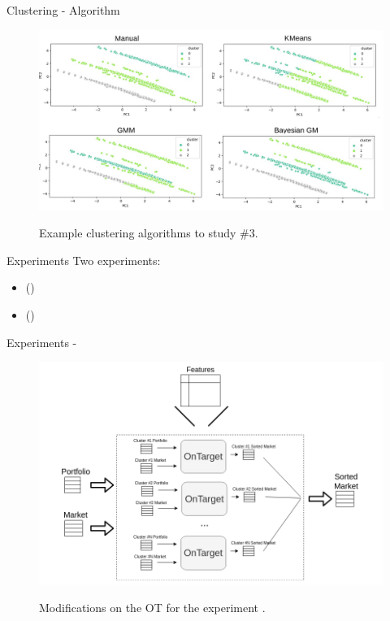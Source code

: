 \begin{frame}{Clustering - Algorithm}
    \begin{figure}
        \centering
        \includegraphics[width=\linewidth]{fig/ch3-cluster-algo-ex3.png}
        \label{fig:cluster-algo-ex3}
        \caption{Example clustering algorithms to study \#3.} 
    \end{figure}
\end{frame}


\begin{frame}{Experiments} \pause
    Two experiments: \pause
    \begin{itemize}
        \item \fullNameExperimentI{} (\nameExperimentI{}) \pause
        \item \fullNameExperimentII{} (\nameExperimentII{})
    \end{itemize}
\end{frame}


\begin{frame}{Experiments - \fullNameExperimentI{}}
    \begin{figure}
        \centering
        \includegraphics[width=.9\linewidth]{fig/ch3-one-run-each-cluster.png}
        \label{fig:one-run-each-cluster}
        \caption{Modifications on the OT for the experiment \nameExperimentI{}.} 
    \end{figure}
\end{frame}

